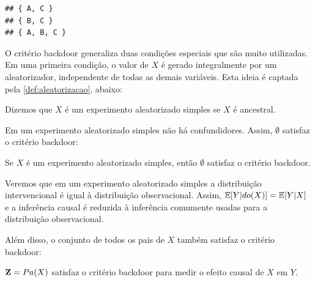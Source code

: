 \begin{example}
\begin{knitrout}
\color{fgcolor}\begin{kframe}
\begin{alltt}
 \hlkwb{<-} \hlstd{(}\hlstd{)}

  \hlstd{=} \hlstd{)}
\end{alltt}
\begin{verbatim}
## { A, C }
## { B, C }
## { A, B, C }
\end{verbatim}
\end{kframe}
\end{knitrout}
\end{example}

O critério backdoor generaliza duas condições especiais que
são muito utilizadas.
Em uma primeira condição, 
o valor de $X$ é gerado integralmente por
um aleatorizador, independente de todas as demais variáveis.
Esta ideia é captada pela 
\cref{def:aleatorizacao}, abaixo:

\begin{definition}
 \label{def:aleatorizacao}
 Dizemos que $X$ é um experimento aleatorizado simples 
 se $X$ é ancestral.
\end{definition}

Em um experimento aleatorizado simples não há confundidores.
Assim, $\emptyset$ satisfaz o critério backdoor:

\begin{lemma}
 \label{lemma:backdoor_random}
 Se $X$ é um experimento aleatorizado simples, então
 $\emptyset$ satisfaz o critério backdoor.
\end{lemma}

Veremos que em um experimento aleatorizado simples a
distribuição intervencional é igual 
à distribuição observacional.
Assim, ${\mathbb E}[Y|do(X)] = {\mathbb E}[Y|X]$ e
a inferência causal é reduzida 
à inferência comumente usadas para
a distribuição observacional.

Além disso, o conjunto de todos os pais de $X$
também satisfaz o critério backdoor:

\begin{lemma}
 \label{lemma:backdoor_pais}
 ${\mathbf{Z}} = Pa(X)$ satisfaz o critério backdoor para
 medir o efeito causal de $X$ em $Y$.
\end{lemma}

